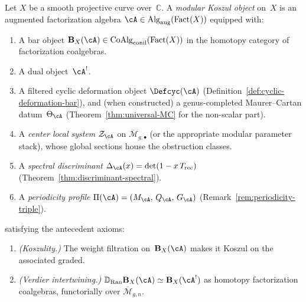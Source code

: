 \begin{definition}\label{def:modular-koszul-homotopy}
Let $X$ be a smooth projective curve over~$\mathbb{C}$.
A \emph{modular Koszul object} on~$X$ is an augmented factorization algebra
$\cA \in \operatorname{Alg}_{\mathrm{aug}}(\operatorname{Fact}(X))$
equipped with:
\begin{enumerate}[label=\textup{(D\arabic*$_\infty$)}]
\item\label{D:bar-htpy}
A bar object
$\mathbf{B}_X(\cA) \in \operatorname{CoAlg}_{\mathrm{conil}}(\operatorname{Fact}(X))$
in the homotopy category of factorization coalgebras.

\item\label{D:dual-htpy}
A dual object~$\cA^!$.

\item\label{D:deformation-htpy}
A filtered cyclic deformation object
$\Defcyc(\cA)$
(Definition~\ref{def:cyclic-deformation-bar}),
and (when constructed)
a genus-completed Maurer--Cartan datum~$\Theta_{\cA}$
\textup{(}Theorem~\textup{\ref{thm:universal-MC}} for the
non-scalar part\textup{)}.

\item\label{D:center-htpy}
A \emph{center local system}
$\mathcal{Z}_{\cA}$ on $\overline{\mathcal{M}}_{g,\bullet}$
\textup{(}or the appropriate modular parameter stack\textup{)},
whose global sections house the obstruction classes.

\item\label{D:discriminant-htpy}
A \emph{spectral discriminant}
$\Delta_{\cA}(x) = \det(1 - x\, T_{\mathrm{rec}})$
\textup{(}Theorem~\textup{\ref{thm:discriminant-spectral})}.

\item\label{D:periodicity-htpy}
A \emph{periodicity profile}
$\Pi(\cA) = (M_{\cA},\, Q_{\cA},\, G_{\cA})$
\textup{(}Remark~\textup{\ref{rem:periodicity-triple})}.
\end{enumerate}

\noindent satisfying the antecedent axioms:
\begin{enumerate}[label=\textup{(MK\arabic*$_\infty$)}]
\item\label{MK:koszul-htpy}
\emph{(Koszulity.)}
The weight filtration on~$\mathbf{B}_X(\cA)$ makes it Koszul on
the associated graded.

\item\label{MK:verdier-htpy}
\emph{(Verdier intertwining.)}
$\mathbb{D}_{\operatorname{Ran}} \mathbf{B}_X(\cA) \simeq
\mathbf{B}_X(\cA^!)$
as homotopy factorization coalgebras, functorially over
$\overline{\mathcal{M}}_{g,n}$.


\end{enumerate}
\end{definition}
